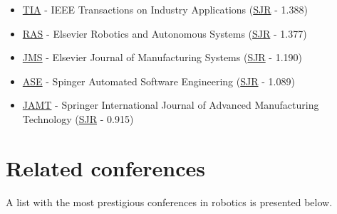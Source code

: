 \begin{itemize}[leftmargin=2em]
	\item \href{http://ieeexplore.ieee.org/xpl/RecentIssue.jsp?punumber=28}{TIA} - IEEE Transactions on Industry Applications (\href{http://www.scimagojr.com/journalsearch.php?q=17361\&tip=sid\&clean=0}{SJR} - 1.388)
	\item \href{http://www.journals.elsevier.com/robotics-and-autonomous-systems/}{RAS} - Elsevier Robotics and Autonomous Systems (\href{http://www.scimagojr.com/journalsearch.php?q=18079\&tip=sid\&clean=0}{SJR} - 1.377)
	\item \href{http://www.journals.elsevier.com/journal-of-manufacturing-systems/}{JMS} - Elsevier Journal of Manufacturing Systems (\href{http://www.scimagojr.com/journalsearch.php?q=14966\&tip=sid\&clean=0}{SJR} - 1.190)
	\item \href{http://www.springer.com/computer/ai/journal/10515}{ASE} - Spinger Automated Software Engineering (\href{http://www.scimagojr.com/journalsearch.php?q=24145\&tip=sid\&clean=0}{SJR} - 1.089)
	\item \href{http://www.springer.com/engineering/production+engineering/journal/170}{JAMT} - Springer International Journal of Advanced Manufacturing Technology (\href{http://www.scimagojr.com/journalsearch.php?q=20428\&tip=sid\&clean=0}{SJR} - 0.915)
\end{itemize}



\section{Related conferences}

A list with the most prestigious conferences in robotics is presented below.


